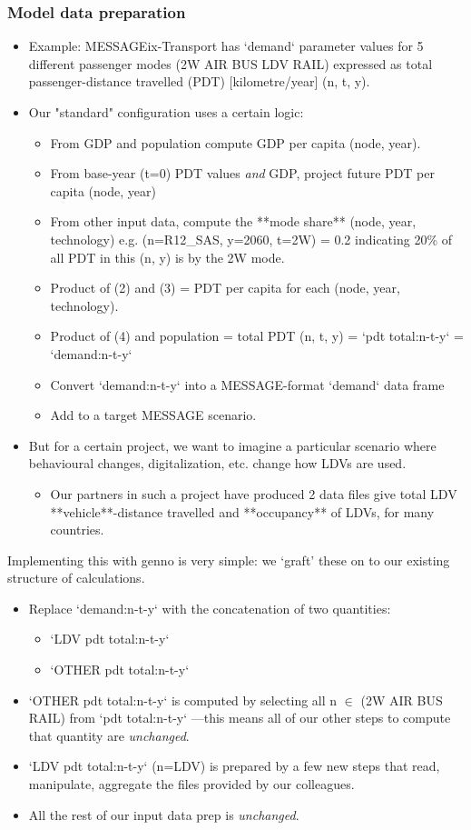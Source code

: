 \documentclass[12pt,aspectratio=169]{beamer}
\begin{document}
\begin{frame}[allowframebreaks]
\frametitle{Model data preparation}
\begin{itemize}
  \item Example: MESSAGEix-Transport has `demand` parameter values for 5 different passenger modes (2W AIR BUS LDV RAIL) expressed as total passenger-distance travelled (PDT) [kilometre/year] (n, t, y).
  \item Our "standard" configuration uses a certain logic:
    \begin{itemize}
      \item From GDP and population compute GDP per capita (node, year).
      \item From base-year (t=0) PDT values \emph{and} GDP, project future PDT per capita (node, year)
      \item From other input data, compute the **mode share** (node, year, technology) e.g. (n=R12_SAS, y=2060, t=2W) = 0.2 indicating 20\% of all PDT in this (n, y) is by the 2W mode.
      \item Product of (2) and (3) = PDT per capita for each (node, year, technology).
      \item Product of (4) and population = total PDT (n, t, y) = `pdt total:n-t-y` = `demand:n-t-y`
      \item Convert `demand:n-t-y` into a MESSAGE-format `demand` data frame
      \item Add to a target MESSAGE scenario.
    \end{itemize}
  \item But for a certain project, we want to imagine a particular scenario where behavioural changes, digitalization, etc. change how LDVs are used.
    \begin{itemize}
      \item Our partners in such a project have produced 2 data files give total LDV **vehicle**-distance travelled and **occupancy** of LDVs, for many countries.
    \end{itemize}
\end{itemize}

Implementing this with genno is very simple:
we ‘graft' these on to our existing structure of calculations.
\begin{itemize}
  \item Replace `demand:n-t-y` with the concatenation of two quantities:
    \begin{itemize}
      \item `LDV pdt total:n-t-y`
      \item `OTHER pdt total:n-t-y`
    \end{itemize}
  \item `OTHER pdt total:n-t-y` is computed by selecting all n $\in$ (2W AIR BUS RAIL)
    from `pdt total:n-t-y`%
    —this means all of our other steps to compute that quantity are \emph{unchanged}.
  \item `LDV pdt total:n-t-y` (n=LDV) is prepared by a few new steps
    that read, manipulate, aggregate the files provided by our colleagues.
  \item All the rest of our input data prep is \emph{unchanged}.
\end{itemize}


\end{frame}
\end{document}
